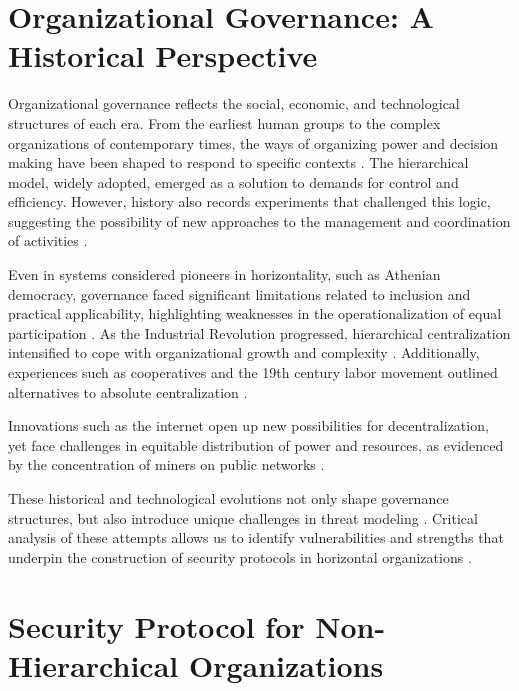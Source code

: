 \section{Organizational Governance: A Historical Perspective}
\label{sec:organizational_governance_historical}

Organizational governance reflects the social, economic, and technological
structures of each era. From the earliest human groups to the complex
organizations of contemporary times, the ways of organizing power and
decision making have been shaped to respond to specific contexts
\cite{Non-HierarchicalForms}. The hierarchical model, widely adopted, emerged as
a solution to demands for control and efficiency. However, history also records
experiments that challenged this logic, suggesting the possibility of new
approaches to the management and coordination of activities
\cite{WorkerCooperativesinAmerica, WorkerCooperativesandRevolution}.

Even in systems considered pioneers in horizontality, such as Athenian
democracy, governance faced significant limitations related to inclusion and
practical applicability, highlighting weaknesses in the operationalization of
equal participation \cite{AthenianDemocracyABrief}. As the Industrial Revolution
progressed, hierarchical centralization intensified to cope with organizational
growth and complexity \cite{WorkerCooperativesandRevolution}. Additionally,
experiences such as cooperatives and the 19th century labor movement outlined
alternatives to absolute centralization \cite{WorkerCooperativesinAmerica, EverydayRevolutions}.

Innovations such as the internet open up new possibilities for decentralization,
yet face challenges in equitable distribution of power and resources, as
evidenced by the concentration of miners on public networks
\cite{Energytheftdetectionissues}.

These historical and technological evolutions not only shape governance
structures, but also introduce unique challenges in threat modeling
\cite{DoArtifactsHavePolitics, Democraciaeoscodigosinvisiveis}. Critical analysis of
these attempts allows us to identify vulnerabilities and strengths that underpin
the construction of security protocols in horizontal organizations
\cite{Colbac}.

\section{Security Protocol for Non-Hierarchical Organizations}
\label{sec:security_protocol_nonhierarchical}

